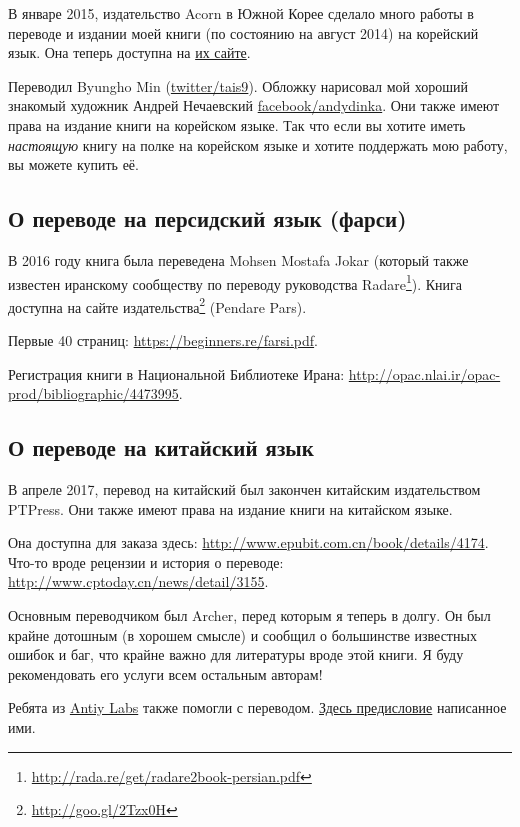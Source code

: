 В январе 2015, издательство Acorn в Южной Корее сделало много работы в переводе 
и издании моей книги (по состоянию на август 2014) на корейский язык.
Она теперь доступна на \href{http://go.yurichev.com/17343}{их сайте}.

Переводил Byungho Min (\href{http://go.yurichev.com/17344}{twitter/tais9}).
Обложку нарисовал мой хороший знакомый художник Андрей Нечаевский
\href{http://go.yurichev.com/17023}{facebook/andydinka}.
Они также имеют права на издание книги на корейском языке.
Так что если вы хотите иметь \emph{настоящую} книгу на полке на корейском языке и
хотите поддержать мою работу, вы можете купить её.

\subsection*{О переводе на персидский язык (фарси)}

В 2016 году книга была переведена Mohsen Mostafa Jokar (который также известен иранскому сообществу по переводу руководства Radare\footnote{\url{http://rada.re/get/radare2book-persian.pdf}}).
Книга доступна на сайте издательства\footnote{\url{http://goo.gl/2Tzx0H}} (Pendare Pars).

Первые 40 страниц: \url{https://beginners.re/farsi.pdf}.

Регистрация книги в Национальной Библиотеке Ирана: \url{http://opac.nlai.ir/opac-prod/bibliographic/4473995}.

\subsection*{О переводе на китайский язык}

В апреле 2017, перевод на китайский был закончен китайским издательством PTPress. Они также имеют права на издание книги на китайском языке.

Она доступна для заказа здесь: \url{http://www.epubit.com.cn/book/details/4174}. Что-то вроде рецензии и история о переводе: \url{http://www.cptoday.cn/news/detail/3155}.

Основным переводчиком был Archer, перед которым я теперь в долгу.
Он был крайне дотошным (в хорошем смысле) и сообщил о большинстве известных ошибок и баг, что крайне важно для литературы вроде этой книги.
Я буду рекомендовать его услуги всем остальным авторам!

Ребята из \href{http://www.antiy.net/}{Antiy Labs} также помогли с переводом. \href{http://www.epubit.com.cn/book/onlinechapter/51413}{Здесь предисловие} написанное ими.

